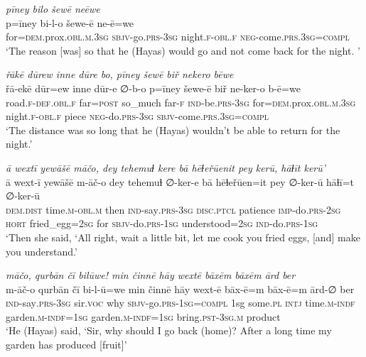 \ea \label{ŽH.70}
\textit{pīney bilo šewē neēwe} \\ 
\gll p=īney bi-l-o šewe-ē ne-ē=we \\ 
 for\textsc{=dem}.prox\textsc{.obl}\textsc{.m}\textsc{.3sg} \textsc{sbjv-}go\textsc{.prs}\textsc{-3sg} night\textsc{\textsc{.f}}\textsc{-obl}\textsc{\textsc{.f}} \textsc{neg-}come\textsc{.prs}\textsc{.3sg}\textsc{=compl} \\ 
\glt `The reason [was] so that he (Hayas) would go and not come back for the night. '
\z 
 
\ea \label{ŽH.71}
\textit{řākē dūrew inne dūre bo, pīney šewē biř nekero bēwe} \\ 
\gll řā-ekē dūr=ew inne dūr-e ∅-b-o p=īney šewe-ē biř ne-ker-o b-ē=we \\ 
 road\textsc{\textsc{.f}}\textsc{-def}\textsc{.obl}\textsc{\textsc{.f}} far\textsc{=\textsc{post}} so\_much far\textsc{-f} \textsc{ind-}be\textsc{.prs}\textsc{-3sg} for\textsc{=dem}.prox\textsc{.obl}\textsc{.m}\textsc{.3sg} night\textsc{\textsc{.f}}\textsc{-obl}\textsc{\textsc{.f}} piece \textsc{neg-}do\textsc{.prs}\textsc{-3sg} \textsc{sbjv-}come\textsc{.prs}\textsc{.3sg}\textsc{=compl} \\ 
\glt `The distance was so long that he (Hayas) wouldn’t be able to return for the night.'
\z 
 
\ea \label{ŽH.79}
\textit{ā wextī yewāšē māčo, dey tehemuɫ kere bā hēɫeřūenit pey kerū, hāɫīt kerū'} \\ 
\gll ā wext-ī yewāšē m-āč-o dey tehemuɫ ∅-ker-e bā hēɫeřūen=it pey ∅-ker-ū hāɫī=t ∅-ker-ū \\ 
 \textsc{dem.dist} time\textsc{.m}\textsc{-obl}\textsc{.m} then \textsc{ind-}say\textsc{.prs}\textsc{-3sg} \textsc{disc.ptcl} patience \textsc{imp-}do\textsc{.prs}-\textsc{2sg} \textsc{hort} fried\_egg\textsc{=\textsc{2sg}} for \textsc{sbjv-}do\textsc{.prs}\textsc{-1sg} understood\textsc{=\textsc{2sg}} \textsc{ind-}do\textsc{.prs}\textsc{-1sg} \\ 
\glt `Then she said, ‘All right, wait a little bit, let me cook you fried eggs, [and] make you understand.'
\z 
 
\ea \label{ŽH.113}
\textit{māčo, qurbān čī bilūwe! min činnē hāy wextē bāxēm bāxēm ārd ber} \\ 
\gll m-āč-o qurbān čī bi-l-ū=we min činnē hāy wext-ē bāx-ē=m bāx-ē=m ārd-∅ ber \\ 
 \textsc{ind-}say\textsc{.prs}\textsc{-3sg} sir.\textsc{voc} why \textsc{sbjv-}go\textsc{.prs}\textsc{-1sg}\textsc{=compl} 1sg some\textsc{.pl} \textsc{intj} time\textsc{.m}\textsc{-indf} garden\textsc{.m}\textsc{-indf}\textsc{=1sg} garden\textsc{.m}\textsc{-indf}\textsc{=1sg} bring\textsc{.pst}\textsc{-3sg}\textsc{.m} product \\ 
\glt `He (Hayas) said, ‘Sir, why should I go back (home)? After a long time my garden has produced [fruit]'
\z 
 
